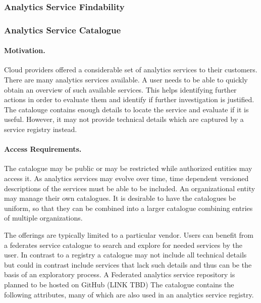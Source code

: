 \documentclass[12pt]{article}
\begin{document}
\subsubsection{Analytics Service Findability}



\subsubsection{Analytics Service Catalogue}

\paragraph{Motivation.} Cloud providers offered a considerable set of analytics services to their customers. There are many analytics services available. A user needs to be able to quickly obtain an overview of such available services. This helps identifying further actions in order to evaluate them and identify if further investigation is justified. The catalouge contains enough details to locate the service and evaluate if it is useful. However, it may not provide technical details which are captured by a service registry instead.

\paragraph{Access Requirements.} The catalogue may be public or may be restricted while authorized entities may access it. As analytics services may evolve over time, time dependent versioned descriptions of the services must be able to be included. An organizational entity may manage their own catalogues. It is desirable to have the catalogues be uniform, so that they can be combined into a larger catalogue combining entries of multiple organizations. 


 The offerings are typically limited to a particular vendor. Users can benefit from a federates service catalogue  to search and explore for needed services by the user. In contrast to a registry a catalogue may not include all technical details but could in contrast include services that lack such details and thus can be the basis of an exploratory process.  A Federated analytics service repository is planned to be hosted on GitHub (LINK TBD)
The catalogue contains the following attributes, many of which are also used in an analytics service registry.
\end{document}
